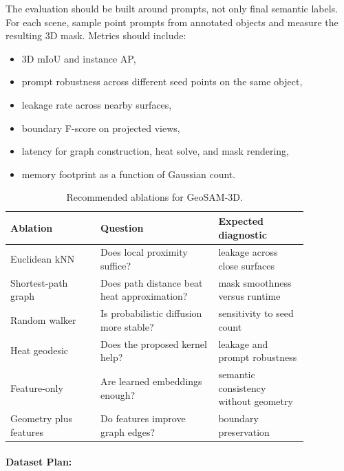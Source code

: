 \documentclass{article}
\begin{document}
The evaluation should be built around prompts, not only final semantic labels. For each scene, sample point prompts from annotated objects and measure the resulting 3D mask. Metrics should include:
\begin{itemize}
  \item 3D mIoU and instance AP,
  \item prompt robustness across different seed points on the same object,
  \item leakage rate across nearby surfaces,
  \item boundary F-score on projected views,
  \item latency for graph construction, heat solve, and mask rendering,
  \item memory footprint as a function of Gaussian count.
\end{itemize}

\begin{table}[t]
\centering
\caption{Recommended ablations for GeoSAM-3D.}
\label{tab:geosam_ablation}
\begin{tabular}{@{}p{0.26\linewidth}p{0.34\linewidth}p{0.26\linewidth}@{}}
\toprule
\textbf{Ablation} & \textbf{Question} & \textbf{Expected diagnostic}\\
\midrule
Euclidean kNN & Does local proximity suffice? & leakage across close surfaces\\
Shortest-path graph & Does path distance beat heat approximation? & mask smoothness versus runtime\\
Random walker & Is probabilistic diffusion more stable? & sensitivity to seed count\\
Heat geodesic & Does the proposed kernel help? & leakage and prompt robustness\\
Feature-only & Are learned embeddings enough? & semantic consistency without geometry\\
Geometry plus features & Do features improve graph edges? & boundary preservation\\
\bottomrule
\end{tabular}
\end{table}

\paragraph{Dataset Plan:}
\end{document}
